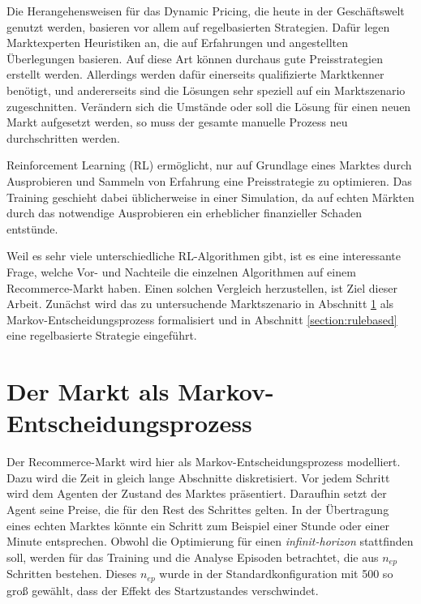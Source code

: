 Die Herangehensweisen für das Dynamic Pricing, die heute in der Geschäftswelt genutzt werden, basieren vor allem auf regelbasierten Strategien.
Dafür legen Marktexperten Heuristiken an, die auf Erfahrungen und angestellten Überlegungen basieren.
Auf diese Art können durchaus gute Preisstrategien erstellt werden.
Allerdings werden dafür einerseits qualifizierte Marktkenner benötigt, und andererseits sind die Lösungen sehr speziell auf ein Marktszenario zugeschnitten.
Verändern sich die Umstände oder soll die Lösung für einen neuen Markt aufgesetzt werden, so muss der gesamte manuelle Prozess neu durchschritten werden.

Reinforcement Learning (RL) ermöglicht, nur auf Grundlage eines Marktes durch Ausprobieren und Sammeln von Erfahrung eine Preisstrategie zu optimieren.
Das Training geschieht dabei üblicherweise in einer Simulation, da auf echten Märkten durch das notwendige Ausprobieren ein erheblicher finanzieller Schaden entstünde.

Weil es sehr viele unterschiedliche RL-Algorithmen gibt, ist es eine interessante Frage, welche Vor- und Nachteile die einzelnen Algorithmen auf einem Recommerce-Markt haben.
Einen solchen Vergleich herzustellen, ist Ziel dieser Arbeit.
Zunächst wird das zu untersuchende Marktszenario in Abschnitt \ref{section:markov} als Markov-Entscheidungsprozess formalisiert und in Abschnitt \ref{section:rulebased} eine regelbasierte Strategie eingeführt.

\section{Der Markt als Markov-Entscheidungsprozess}
\label{section:markov}
Der Recommerce-Markt wird hier als Markov-Entscheidungsprozess modelliert.
Dazu wird die Zeit in gleich lange Abschnitte diskretisiert.
Vor jedem Schritt wird dem Agenten der Zustand des Marktes präsentiert.
Daraufhin setzt der Agent seine Preise, die für den Rest des Schrittes gelten.
In der Übertragung eines echten Marktes könnte ein Schritt zum Beispiel einer Stunde oder einer Minute entsprechen.
Obwohl die Optimierung für einen \textit{infinit-horizon} stattfinden soll, werden für das Training und die Analyse Episoden betrachtet, die aus $n_{ep}$ Schritten bestehen.
Dieses $n_{ep}$ wurde in der Standardkonfiguration mit 500 so groß gewählt, dass der Effekt des Startzustandes verschwindet.

